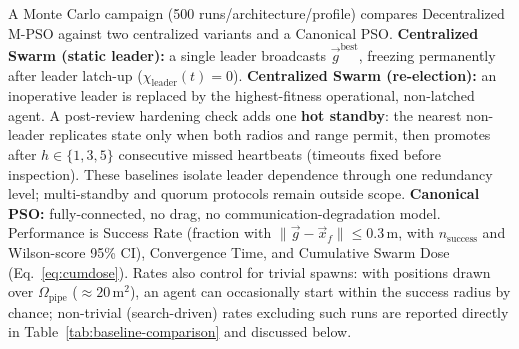 \documentclass[conference]{IEEEtran}
\begin{document}
A Monte Carlo campaign (500 runs/architecture/profile) compares Decentralized M-PSO against two centralized variants and a Canonical PSO. \textbf{Centralized Swarm (static leader):} a single leader broadcasts $\vec{g}^{\text{best}}$, freezing permanently after leader latch-up ($\chi_{\text{leader}}(t)=0$). \textbf{Centralized Swarm (re-election):} an inoperative leader is replaced by the highest-fitness operational, non-latched agent. A post-review hardening check adds one \textbf{hot standby}: the nearest non-leader replicates state only when both radios and range permit, then promotes after $h\in\{1,3,5\}$ consecutive missed heartbeats (timeouts fixed before inspection). These baselines isolate leader dependence through one redundancy level; multi-standby and quorum protocols remain outside scope. \textbf{Canonical PSO:} fully-connected, no drag, no communication-degradation model. Performance is Success Rate (fraction with $\|\vec{g}-\vec{x}_f\|\le0.3\,\text{m}$, with $n_{\text{success}}$ and Wilson-score 95\% CI), Convergence Time, and Cumulative Swarm Dose (Eq.~\ref{eq:cumdose}). Rates also control for trivial spawns: with positions drawn over $\Omega_{\text{pipe}}$ ($\approx20\,\text{m}^2$), an agent can occasionally start within the success radius by chance; non-trivial (search-driven) rates excluding such runs are reported directly in Table~\ref{tab:baseline-comparison} and discussed below.
\end{document}
